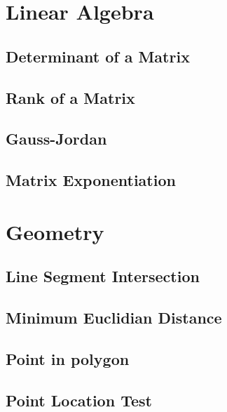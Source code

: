 \documentclass[10pt]{article}
\begin{document}
\begin{multicols*}{2}
\section{Linear Algebra}

\subsection{Determinant of a Matrix}


\subsection{Rank of a Matrix}



\subsection{Gauss-Jordan}



\subsection{Matrix Exponentiation}


\section{Geometry}

\subsection{Line Segment Intersection}

\subsection{Minimum Euclidian Distance}

\subsection{Point in polygon}

\subsection{Point Location Test}


\end{multicols*}
\end{document}
